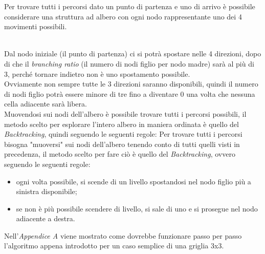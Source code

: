 \documentclass[11pt,a4paper,twocolumn]{IEEEtran}
\newcommand{\mysvg}[2]{}
\newcounter{algoritmo}
\begin{document}
    Per trovare tutti i percorsi dato un punto di partenza e uno di arrivo è possibile considerare una struttura ad albero con ogni nodo rappresentante uno dei 4 movimenti possibili.
	\begin{figure}[h]
		\centering
		\footnotesize{\mysvg{tree1}{8}}
	\end{figure}
	\vspace{-3cm}\\
   Dal nodo iniziale (il punto di partenza) ci si potrà spostare nelle 4 direzioni, dopo di che il \textit{branching ratio} (il numero di nodi figlio per nodo madre) sarà al più di 3, perché tornare indietro non è uno spostamento possibile.\\
   Ovviamente non sempre tutte le 3 direzioni saranno disponibili, quindi il numero di nodi figlio potrà essere minore di tre fino a diventare 0 una volta che nessuna cella adiacente sarà libera.\\
   Muovendosi sui nodi dell'albero è possibile trovare tutti i percorsi possibili, il metodo scelto per esplorare l'intero albero in maniera ordinata è quello del \textit{Backtracking}, quindi seguendo le seguenti regole:
   Per trovare tutti i percorsi bisogna "muoversi" sui nodi dell'albero tenendo conto di tutti quelli visti in precedenza, il metodo scelto per fare ciò è quello del \textit{Backtracking}, ovvero seguendo le seguenti regole:
   \begin{itemize}
   	\item ogni volta possibile, si scende di un livello spostandosi nel nodo figlio più a sinistra disponibile;
   	\item se non è più possibile scendere di livello, si sale di uno e si prosegue nel nodo adiacente a destra.
   \end{itemize}
	
	Nell'\textit{Appendice A} viene mostrato come dovrebbe funzionare passo per passo l'algoritmo appena introdotto per un caso semplice di una griglia 3x3.\medskip\\
	
\end{document}
